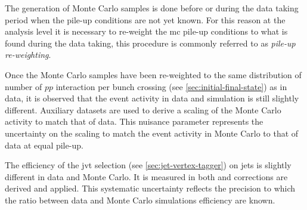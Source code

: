 The generation of Monte Carlo samples is done before or during the data taking
period when the pile-up conditions are not yet known. For this reason at the
analysis level it is necessary to re-weight the \gls{mc} pile-up conditions to
what is found during the data taking, this procedure is commonly referred to as
\emph{pile-up re-weighting}.
\begin{description}[font=\normalfont]
\item[syst\_PRW\_DATASF:] Once the Monte Carlo samples have been re-weighted to
  the same distribution of number of $pp$ interaction per bunch crossing (see
  \cref{sec:initial-final-state}) as in data, it is observed that the event
  activity in data and simulation is still slightly different. Auxiliary
  datasets are used to derive a scaling of the Monte Carlo activity to match
  that of data. This nuisance parameter represents the uncertainty on the
  scaling to match the event activity in Monte Carlo to that of data at equal
  pile-up.
\item[syst\_JvtEfficiency:] The efficiency of the \gls{jvt} selection (see
  \ref{sec:jet-vertex-tagger}) on jets is slightly different in data and Monte
  Carlo. It is measured in both and corrections are derived and applied. This
  systematic uncertainty reflects the precision to which the ratio between data
  and Monte Carlo simulations efficiency are known.
\end{description}
